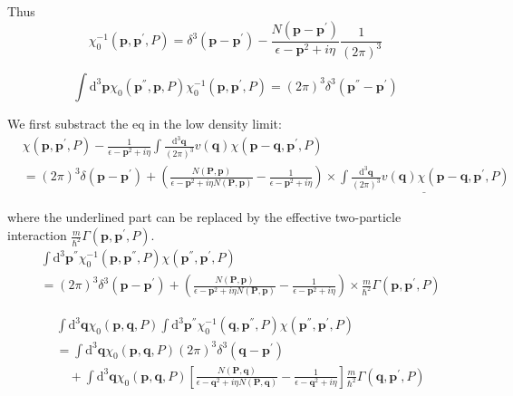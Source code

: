 Thus
\[ \chi_0^{-1}(\mathbf{p},\mathbf{p}^{'},P) = \delta^3(\mathbf{p}-\mathbf{p}^{'}) - \frac{N(\mathbf{p}-\mathbf{p}^{'})}{\epsilon-\mathbf{p}^2+i \eta} \frac{1}{(2\pi)^3} \]

\[ \int \mathrm{d}^3 \mathbf{p} \chi_0(\mathbf{p}^{''},\mathbf{p},P)\chi_0^{-1}(\mathbf{p},\mathbf{p}^{'},P) = (2\pi)^3 \delta^3(\mathbf{p}^{''}-\mathbf{p}^{'})\]

We first substract the eq in the low density limit:
\[ \begin{split} &\chi(\mathbf{p},\mathbf{p}^{'},P) - \frac{1}{\epsilon-\mathbf{p}^2+i \eta} \int \frac{\mathrm{d}^3 \mathbf{q}}{(2\pi)^3} v(\mathbf{q}) \chi(\mathbf{p}-\mathbf{q},\mathbf{p}^{'},P)\\
&=(2\pi)^3 \delta(\mathbf{p}-\mathbf{p}^{'}) + \left( \frac{N(\mathbf{P},\mathbf{p})}{\epsilon - \mathbf{p}^2+i \eta N(\mathbf{P},\mathbf{p})} - \frac{1}{\epsilon - \mathbf{p}^2+i \eta} \right)\times \underline{\int \frac{\mathrm{d}^3 \mathbf{q}}{(2\pi)^3} v(\mathbf{q})\chi(\mathbf{p}-\mathbf{q},\mathbf{p}^{'},P)}
\end{split} \]

where the underlined part can be replaced by the effective two-particle interaction $\frac{m}{\hbar^2}\Gamma(\mathbf{p},\mathbf{p}^{'},P)$.
\[ \begin{split} &\int \mathrm{d}^3 \mathbf{p}^{''} \chi_0^{-1}(\mathbf{p},\mathbf{p}^{''},P)\chi(\mathbf{p}^{''},\mathbf{p}^{'},P)\\
&=(2\pi)^3 \delta^3(\mathbf{p}-\mathbf{p}^{'}) + \left( \frac{N(\mathbf{P},\mathbf{p})}{\epsilon - \mathbf{p}^2+i \eta N(\mathbf{P},\mathbf{p})} - \frac{1}{\epsilon - \mathbf{p}^2+i \eta} \right)\times\frac{m}{\hbar^2}\Gamma(\mathbf{p},\mathbf{p}^{'},P)
\end{split} \]

\[ \begin{split} &\int \mathrm{d}^3\mathbf{q} \chi_0(\mathbf{p},\mathbf{q},P) \int \mathrm{d}^3 \mathbf{p}^{''} \chi_0^{-1}(\mathbf{q},\mathbf{p}^{''},P)\chi(\mathbf{p}^{''},\mathbf{p}^{'},P)\\
&= \int \mathrm{d}^3\mathbf{q}\chi_0(\mathbf{p},\mathbf{q},P)(2\pi)^3\delta^3(\mathbf{q}-\mathbf{p}^{'})\\&\quad+ \int \mathrm{d}^3 \mathbf{q} \chi_0(\mathbf{p},\mathbf{q},P) \left[ \frac{N(\mathbf{P},\mathbf{q})}{\epsilon - \mathbf{q}^2+i \eta N(\mathbf{P},\mathbf{q})} - \frac{1}{\epsilon - \mathbf{q}^2+i \eta} \right] \frac{m}{\hbar^2} \Gamma(\mathbf{q},\mathbf{p}^{'},P)
\end{split} \]


